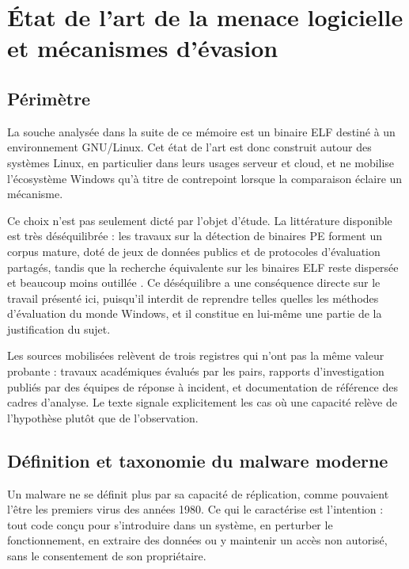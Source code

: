 \chapter{État de l'art de la menace logicielle et mécanismes d'évasion}

\section*{Périmètre}

La souche analysée dans la suite de ce mémoire est un binaire ELF destiné à un environnement GNU/Linux. Cet état de l'art est donc construit autour des systèmes Linux, en particulier dans leurs usages serveur et cloud, et ne mobilise l'écosystème Windows qu'à titre de contrepoint lorsque la comparaison éclaire un mécanisme.

Ce choix n'est pas seulement dicté par l'objet d'étude. La littérature disponible est très déséquilibrée : les travaux sur la détection de binaires PE forment un corpus mature, doté de jeux de données publics et de protocoles d'évaluation partagés, tandis que la recherche équivalente sur les binaires ELF reste dispersée et beaucoup moins outillée \cite{crossArchSurvey}. Ce déséquilibre a une conséquence directe sur le travail présenté ici, puisqu'il interdit de reprendre telles quelles les méthodes d'évaluation du monde Windows, et il constitue en lui-même une partie de la justification du sujet.

Les sources mobilisées relèvent de trois registres qui n'ont pas la même valeur probante : travaux académiques évalués par les pairs, rapports d'investigation publiés par des équipes de réponse à incident, et documentation de référence des cadres d'analyse. Le texte signale explicitement les cas où une capacité relève de l'hypothèse plutôt que de l'observation.

\section{Définition et taxonomie du malware moderne}

Un malware ne se définit plus par sa capacité de réplication, comme pouvaient l'être les premiers virus des années 1980. Ce qui le caractérise est l'intention : tout code conçu pour s'introduire dans un système, en perturber le fonctionnement, en extraire des données ou y maintenir un accès non autorisé, sans le consentement de son propriétaire.

